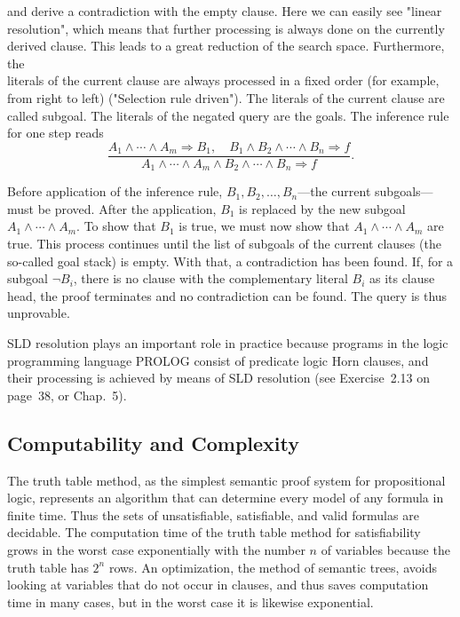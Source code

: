 \documentclass[10pt]{book}
\begin{document}
and derive a contradiction with the empty clause. Here we can easily see "linear resolution", which means that further processing is always done on the currently derived clause. This leads to a great reduction of the search space. Furthermore, the\\
literals of the current clause are always processed in a fixed order (for example, from right to left) ("Selection rule driven"). The literals of the current clause are called subgoal. The literals of the negated query are the goals. The inference rule for one step reads
$$
\frac{A_{1}\wedge\cdots\wedge A_{m}\Rightarrow B_{1},\quad B_{1}\wedge B_{2}\wedge\cdots\wedge B_{n}\Rightarrow f}{A_{1}\wedge\cdots\wedge A_{m}\wedge B_{2}\wedge\cdots\wedge B_{n}\Rightarrow f}.
$$

Before application of the inference rule, $B_{1}, B_{2}, \ldots, B_{n}$---the current subgoals---must be proved. After the application, $B_{1}$ is replaced by the new subgoal $A_{1}\wedge\cdots\wedge A_{m}$. To show that $B_{1}$ is true, we must now show that $A_{1}\wedge\cdots\wedge A_{m}$ are true. This process continues until the list of subgoals of the current clauses (the so-called goal stack) is empty. With that, a contradiction has been found. If, for a subgoal $\neg B_{i}$, there is no clause with the complementary literal $B_{i}$ as its clause head, the proof terminates and no contradiction can be found. The query is thus unprovable.

SLD resolution plays an important role in practice because programs in the logic programming language PROLOG consist of predicate logic Horn clauses, and their processing is achieved by means of SLD resolution (see Exercise~2.13 on page~38, or Chap.~5).

\subsection{Computability and Complexity}
The truth table method, as the simplest semantic proof system for propositional logic, represents an algorithm that can determine every model of any formula in finite time. Thus the sets of unsatisfiable, satisfiable, and valid formulas are decidable. The computation time of the truth table method for satisfiability grows in the worst case exponentially with the number $n$ of variables because the truth table has $2^{n}$ rows. An optimization, the method of semantic trees, avoids looking at variables that do not occur in clauses, and thus saves computation time in many cases, but in the worst case it is likewise exponential.
\end{document}
